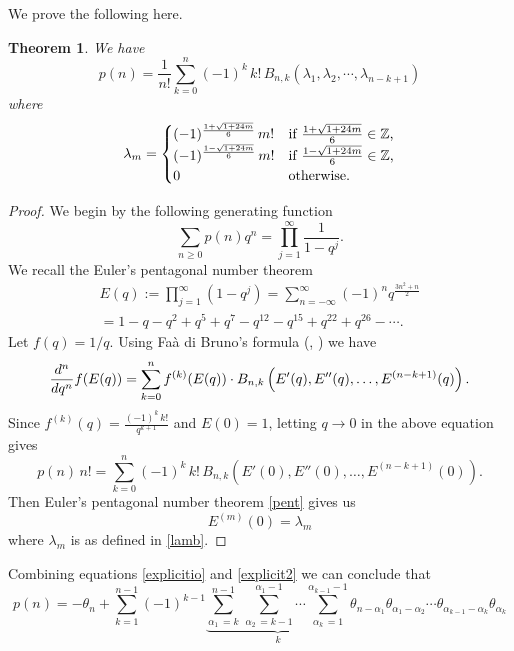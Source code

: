 \documentclass{amsart}
\theoremstyle{plain}
\newtheorem{theorem}{Theorem}
\theoremstyle{definition}
\begin{document}
We prove the following here.
\begin{theorem}
We have
\begin{equation}
\label{explicit2}
p(n)=\frac{1}{n!}\sum_{k=0}^{n}(-1)^{k}\, k!\, B_{n,k}(\lambda_{1},\lambda_{2},\cdots,\lambda_{n-k+1})
\end{equation}
where
\begin{equation}
\normalfont
\label{lamb}
\lambda_{m}=
\begin{cases}
(-1)^{\frac{1+\sqrt{1+24m}}{6}}\, m! & \text{if $\frac{1+\sqrt{1+24m}}{6}\in \mathbb{Z}$,}\\
(-1)^{\frac{1-\sqrt{1+24m}}{6}}\, m! & \text{if $\frac{1-\sqrt{1+24m}}{6}\in \mathbb{Z}$,}\\
0 & \text{otherwise.}
\end{cases}
\end{equation}
\end{theorem}
\begin{proof}
We begin by the following generating function \cite[Equation 22.13]{Fine}
\begin{equation}
\sum_{n\geq 0}p(n)q^{n}=\prod_{j=1}^{\infty}\frac{1}{1-q^{j}}.
\end{equation}
We recall the Euler's pentagonal number theorem \cite[Equation 7.8]{Fine}
\begin{eqnarray}
\label{pent}
E(q):=\prod_{j=1}^{\infty}(1-q^{j})=\sum_{n=-\infty}^{\infty}(-1)^{n}q^{\frac{3n^{2}+n}{2}}\\
\nonumber =1-q-q^2+q^5+q^7-q^{12}-q^{15}+q^{22}+q^{26}-\cdots.
\end{eqnarray}
Let $f(q)=1/q$. Using Fa\`{a} di Bruno's formula (\cite[p. 137]{Comtet}, \cite[Ch. 12]{Andrews}) we have
\begin{equation}
\label{faa}
{d^n \over dq^n} f(E(q)) = \sum_{k=0}^n f^{(k)}(E(q))\cdot B_{n,k}\left(E'(q),E''(q),\dots,E^{(n-k+1)}(q)\right).
\end{equation}
Since $f^{(k)}(q)=\frac{(-1)^{k}\,k!}{q^{k+1}}$ and $E(0)=1$, letting $q\rightarrow 0$ in the above equation gives
$$
p(n)\, n! = \sum_{k=0}^n (-1)^{k}\, k!\, B_{n,k}\left(E'(0),E''(0),\dots,E^{(n-k+1)}(0)\right).
$$
Then Euler's pentagonal number theorem \eqref{pent} gives us
$$
E^{(m)}(0)=\lambda_{m}
$$
where $\lambda_{m}$ is as defined in \eqref{lamb}.
\end{proof}
Combining equations \eqref{explicitio} and \eqref{explicit2} we can conclude that
$$
p(n)=-\theta_{n}+\sum_{k=1}^{n-1}(-1)^{k-1} \underbrace{\sum_{\alpha_1\,=  k}^{n-1} \, \sum_{\alpha_2\,=  k-1}^{\alpha_1-1} \cdots  \sum_{\alpha_k\, = 1}^{\alpha_{k-1}-1}}_{k}\theta_{n-\alpha_1} \theta_{\alpha_1 -\alpha_2} \cdots \theta_{\alpha_{k-1}-\alpha_k} \theta_{\alpha_k}
$$
\end{document}
